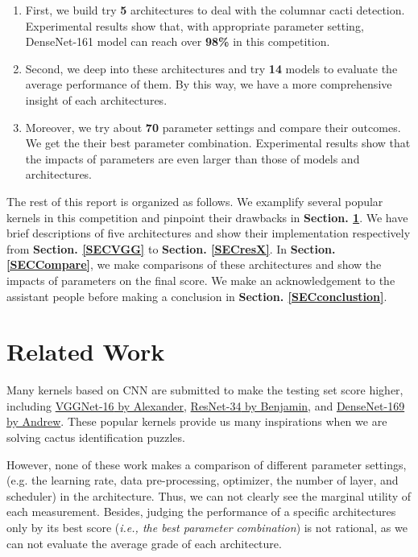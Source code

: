 \documentclass[10pt,twocolumn,letterpaper]{article}
\begin{document}
\begin{enumerate}
    \item First, we build try \textbf{5} architectures to deal with the columnar cacti detection. Experimental results show that, with appropriate parameter setting, \textsf{DenseNet-161} model can reach over \textbf{98\%} in this competition.
    \item Second, we deep into these architectures and try \textbf{14} models to evaluate the average performance of them. By this way, we have a more comprehensive insight of each architectures.
    \item Moreover, we try about \textbf{70} parameter settings and compare their outcomes. We get the their best parameter combination. Experimental results show that the impacts of parameters are even larger than those of models and architectures.
\end{enumerate}

The rest of this report is organized as follows. We examplify several popular kernels in this competition and pinpoint their drawbacks in \textbf{Section. \ref{SECrelated}}. We have brief descriptions of five architectures and show their implementation respectively from \textbf{Section. \ref{SECVGG}} to \textbf{Section. \ref{SECresX}}. In \textbf{Section. \ref{SECCompare}}, we make comparisons of these architectures and show the impacts of parameters on the final score. We make an acknowledgement to the assistant people before making a conclusion in \textbf{Section. \ref{SECconclustion}}.


\section{Related Work}\label{SECrelated}

Many kernels based on CNN are submitted to make the testing set score higher, including \href{https://www.kaggle.com/ateplyuk/keras-transfer-vgg16}{\textsf{VGGNet-16} by Alexander}, \href{https://www.kaggle.com/ateplyuk/keras-transfer-densenet121}{\textsf{ResNet-34} by Benjamin}, and \href{https://www.kaggle.com/artgor/detecting-cactus-with-kekas}{\textsf{DenseNet-169} by Andrew}. These popular kernels provide us many inspirations when we are solving cactus identification puzzles.

However, none of these work makes a comparison of different parameter settings, (e.g. the learning rate, data pre-processing, optimizer, the number of layer, and scheduler) in the architecture. Thus, we can not clearly see the marginal utility of each measurement. Besides, judging the performance of a specific architectures only by its best score (\textit{i.e., the best parameter combination}) is not rational, as we can not evaluate the average grade of each architecture. 
\end{document}
